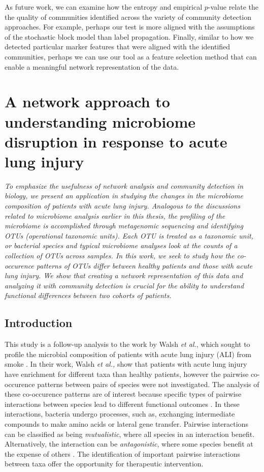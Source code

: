 As future work, we can examine how the entropy and empirical $p$-value relate the the quality of communities identified across the variety of community detection approaches. For example, perhaps our test is more aligned with the assumptions of the stochastic block model than label propagation. Finally, similar to how we detected particular marker features that were aligned with the identified communities, perhaps we can use our tool as a feature selection method that can enable a meaningful network representation of the data. 


\chapter{A network approach to understanding microbiome disruption in response to acute lung injury}

\emph{To emphasize the usefulness of network analysis and community detection in biology, we present an application in studying the changes in the microbiome composition of patients with acute lung injury. Analogous to the discussions related to microbiome analysis earlier in this thesis, the profiling of the microbiome is accomplished through metagenomic sequencing and identifying OTUs (operational taxonomic units). Each OTU is treated as a taxonomic unit, or bacterial species and typical microbiome analyses look at the counts of a collection of OTUs across samples. In this work, we seek to study how the co-occurence patterns of OTUs differ between healthy patients and those with acute lung injury. We show that creating a network representation of this data and analyzing it with community detection is crucial for the ability to understand functional differences between two cohorts of patients.}

\section{Introduction}
 This study is a follow-up analysis to the work by Walsh \emph{et al.}, which sought to profile the microbial composition of patients with acute lung injury (ALI) from smoke \cite{walsh2017}. In their work, Walsh \emph{et al.,} show that patients with acute lung injury have enrichment for different taxa than healthy patients, however the pairwise co-occurence patterns between pairs of species were not investigated. The analysis of these co-occurence patterns are of interest because specific types of pairwise interactions between species lead to different functional outcomes \cite{boon}.  In these interactions, bacteria undergo processes, such as, exchanging intermediate compounds to make amino acids or lateral gene transfer. Pairwise interactions can be classified as being \emph{mutualistic}, where all species in an interaction benefit. Alternatively, the interaction can be \emph{antagonistic}, where some species benefit at the expense of others \cite{mutualism}. The identification of important pairwise interactions between taxa offer the opportunity for therapeutic intervention.  
 
